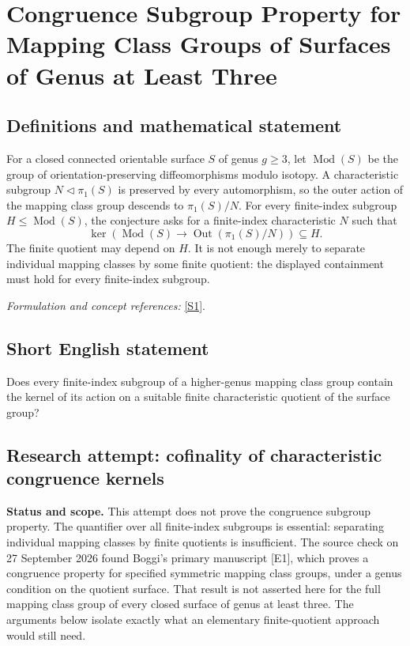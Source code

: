 \documentclass[11pt]{article}
\begin{document}
\section*{\texorpdfstring{Congruence Subgroup Property for Mapping Class Groups of Surfaces of Genus at Least Three}{Congruence Subgroup Property for Mapping Class Groups of Surfaces of Genus at Least Three}}\label{statement}
\subsection{Definitions and mathematical statement}
For a closed connected orientable surface $S$ of genus $g\ge3$, let $\operatorname{Mod}(S)$ be the group of orientation-preserving diffeomorphisms modulo isotopy. A characteristic subgroup $N\triangleleft\pi_1(S)$ is preserved by every automorphism, so the outer action of the mapping class group descends to $\pi_1(S)/N$. For every finite-index subgroup $H\le\operatorname{Mod}(S)$, the conjecture asks for a finite-index characteristic $N$ such that
\[
 \ker\!\left(\operatorname{Mod}(S)\longrightarrow
 \operatorname{Out}(\pi_1(S)/N)\right)\subseteq H.
\]
The finite quotient may depend on $H$. It is not enough merely to separate individual mapping classes by some finite quotient: the displayed containment must hold for every finite-index subgroup.
\par\smallskip\textit{Formulation and concept references:} \href{https://arxiv.org/pdf/math/0608325}{[S1]}.

\subsection{Short English statement}
Does every finite-index subgroup of a higher-genus mapping class group contain the kernel of its action on a suitable finite characteristic quotient of the surface group?
\subsection{Research attempt: cofinality of characteristic congruence kernels}
\textbf{Status and scope.} This attempt does not prove the congruence subgroup property. The quantifier over all finite-index subgroups is essential: separating individual mapping classes by finite quotients is insufficient. The source check on 27 September 2026 found Boggi's primary manuscript [E1], which proves a congruence property for specified symmetric mapping class groups, under a genus condition on the quotient surface. That result is not asserted here for the full mapping class group of every closed surface of genus at least three. The arguments below isolate exactly what an elementary finite-quotient approach would still need.
\end{document}
